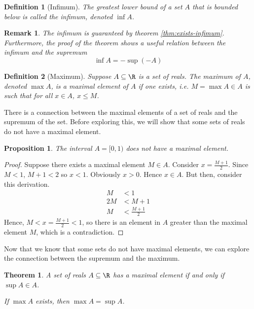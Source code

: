 \documentclass[letterpaper,11pt]{article}
\newtheorem{prop}{Proposition}
\newtheorem{thm}{Theorem}
\newtheorem{defn}{Definition}
\newtheorem{rem}{Remark}
\begin{document}
\begin{defn}[Infimum]
  The greatest lower bound of a set $A$ that is bounded below is called the
  \emph{infimum}, denoted $\inf A$.
\end{defn}

\begin{rem}
  The infimum is guaranteed by theorem \ref{thm:exists-infimum}. Furthermore,
  the proof of the theorem shows a useful relation between the infimum and the
  supremum
  \begin{equation}
    \inf A = - \sup(-A)
    \label{eq:inf-sup-neg}
  \end{equation}
\end{rem}

\begin{defn}[Maximum]
  Suppose $A \subseteq \R$ is a set of reals.
  The \emph{maximum} of $A$, denoted $\max A$, is a maximal element of $A$ if
  one exists, i.e. $M = \max A \in A$ is such that for all $x \in A$,
  $x \leq M$.
\end{defn}

There is a connection between the maximal elements of a set of reals and the
supremum of the set. Before exploring this, we will show that some sets of
reals do not have a maximal element.

\begin{prop}
  The interval $A = [0, 1)$ does not have a maximal element.
\end{prop}

\begin{proof}
  Suppose there exists a maximal element $M \in A$.
  Consider $x = \frac{M + 1}{2}$.
  Since $M < 1$, $M + 1 < 2$ so $x < 1$.
  Obviously $x > 0$.
  Hence $x \in A$.
  But then, consider this derivation.
  \begin{align*}
    M &< 1 \\
    2M &< M + 1 \\
    M &< \frac{M + 1}{2}
  \end{align*}
  Hence, $M < x = \frac{M + 1}{2} < 1$, so there is an element in $A$ greater
  than the maximal element $M$, which is a contradiction.
\end{proof}

Now that we know that some sets do not have maximal elements, we can explore
the connection between the supremum and the maximum.

\begin{thm}
  A set of reals $A \subseteq \R$ has a maximal element if and only if
  $\sup A \in A$.

  If $\max A$ exists, then $\max A = \sup A$.
\end{thm}
\end{document}
